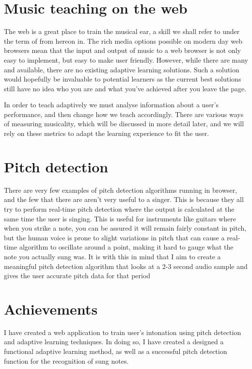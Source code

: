 \section{Music teaching on the web}

\vspace{1em}
\par
The web is a great place to train the musical ear, a skill we shall refer to under the term of  from hereon in. The rich media options possible on modern day web browsers mean that the input and output of music to a web browser is not only easy to implement, but easy to make user friendly. However, while there are many  and  available, there are no existing adaptive learning solutions. Such a solution would hopefully be invaluable to potential learners as the current best solutions still have no idea who you are and what you've achieved after you leave the page.
\par
In order to teach adaptively we must analyse information about a user's performance, and then change how we teach accordingly. 
There are various ways of measuring musicality, which will be discussed in more detail later, and we will rely on these metrics to adapt the learning experience to fit the user.

\section{Pitch detection}
There are very few examples of pitch detection algorithms running in browser, and the few that there are aren't very useful to a singer\cite{webaudiodemos,audioStretch}. This is because they all try to perform real-time pitch detection where the output is calculated at the same time the user is singing. This is useful for instruments like guitars where when you strike a note, you can be assured it will remain fairly constant in pitch, but the human voice is prone to slight variations in pitch that can cause a real-time algorithm to oscillate around a point, making it hard to gauge what the note you actually sung was. It is with this in mind that I aim to create a meaningful pitch detection algorithm that looks at a 2-3 second audio sample and gives the user accurate pitch data for that period


\section{Achievements}

I have created a web application to train user's intonation using pitch detection and adaptive learning techniques. In doing so, I have created a designed a functional adaptive learning method, as well as a successful pitch detection function for the recognition of sung notes.